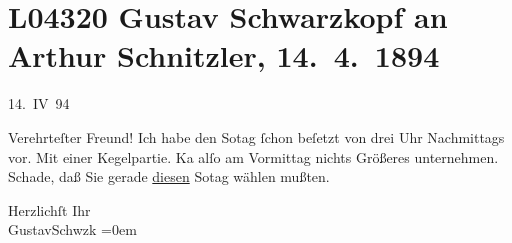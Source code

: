 

\section[Gustav Schwarzkopf an Arthur Schnitzler, 14. 4. 1894]{L04320 Gustav Schwarzkopf an Arthur Schnitzler, 14. 4. 1894}
\nopagebreak{}
\rehead{ }\normalsize\beginnumbering{}
\toendnotes[C]{\smallbreak\pagebreak[2]}
\toendnotes[C]{\smallbreak}
\pstart
           \raggedleft{}{\pb}14. IV 94\pend
           
\pstart{}Verehrteſter Freund!\pend\vspace{0.5em}
\pstart
           Ich habe den So{\geminationn}tag{ }ſchon beſetzt von drei
               Uhr Nachmittags vor. Mit einer Kegelpartie. Ka{\geminationn} alſo am
               Vormittag nichts Größeres unternehmen. Schade, daß Sie gerade \uline{diesen} So{\geminationn}tag wählen mußten.\pend
           
\pstart
           Herzlichſt Ihr{\\[\baselineskip]}\spacefill\mbox{GustavSchwzk}\pend
           \leftskip=0em{}\endnumbering{}
\begin{anhang}
\end{anhang}\newcommand{\dateiname}{L04320}\newcommand{\titel}{Gustav Schwarzkopf an Arthur Schnitzler, 14. 4. 1894}\newcommand{\editorInnen}{Herausgegeben von Jahnke, SelmaMüller, Martin Anton}
